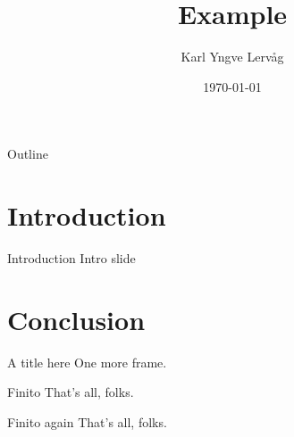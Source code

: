 \documentclass{beamer}
\title{Example}
\author{Karl Yngve Lervåg}
\date{\today}
\begin{document}
\begin{frame}{Outline}
  \tableofcontents
\end{frame}

\section{Introduction}
\begin{frame}{Introduction}
  Intro slide
\end{frame}

\section{Conclusion}
\begin{frame}{A title here}
  One more frame.
\end{frame}
\begin{frame}{Finito}
  That's all, folks.
\end{frame}
\begin{frame}[fragile]{Finito again}
  That's all, folks.
\end{frame}
\end{document}
